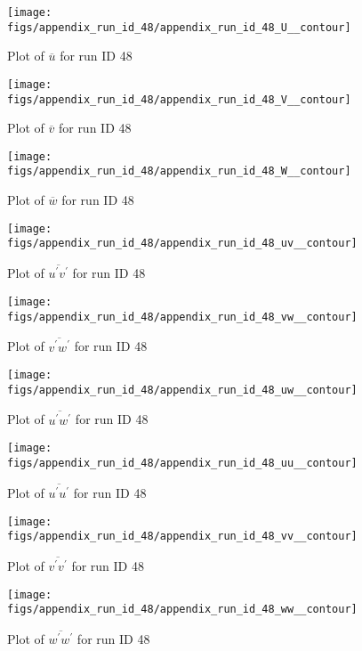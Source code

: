 \begin{figure}[H]
\centering
\texttt{[image: figs/appendix\_run\_id\_48/appendix\_run\_id\_48\_U\_\_contour]}
\caption{Plot of $\overline{u}$ for run ID 48}
\label{fig:appendix_run_id_48_U__contour}
\end{figure}


\begin{figure}[H]
\centering
\texttt{[image: figs/appendix\_run\_id\_48/appendix\_run\_id\_48\_V\_\_contour]}
\caption{Plot of $\overline{v}$ for run ID 48}
\label{fig:appendix_run_id_48_V__contour}
\end{figure}


\begin{figure}[H]
\centering
\texttt{[image: figs/appendix\_run\_id\_48/appendix\_run\_id\_48\_W\_\_contour]}
\caption{Plot of $\overline{w}$ for run ID 48}
\label{fig:appendix_run_id_48_W__contour}
\end{figure}


\begin{figure}[H]
\centering
\texttt{[image: figs/appendix\_run\_id\_48/appendix\_run\_id\_48\_uv\_\_contour]}
\caption{Plot of $\overline{u^\prime v^\prime}$ for run ID 48}
\label{fig:appendix_run_id_48_uv__contour}
\end{figure}


\begin{figure}[H]
\centering
\texttt{[image: figs/appendix\_run\_id\_48/appendix\_run\_id\_48\_vw\_\_contour]}
\caption{Plot of $\overline{v^\prime w^\prime}$ for run ID 48}
\label{fig:appendix_run_id_48_vw__contour}
\end{figure}


\begin{figure}[H]
\centering
\texttt{[image: figs/appendix\_run\_id\_48/appendix\_run\_id\_48\_uw\_\_contour]}
\caption{Plot of $\overline{u^\prime w^\prime}$ for run ID 48}
\label{fig:appendix_run_id_48_uw__contour}
\end{figure}


\begin{figure}[H]
\centering
\texttt{[image: figs/appendix\_run\_id\_48/appendix\_run\_id\_48\_uu\_\_contour]}
\caption{Plot of $\overline{u^\prime u^\prime}$ for run ID 48}
\label{fig:appendix_run_id_48_uu__contour}
\end{figure}


\begin{figure}[H]
\centering
\texttt{[image: figs/appendix\_run\_id\_48/appendix\_run\_id\_48\_vv\_\_contour]}
\caption{Plot of $\overline{v^\prime v^\prime}$ for run ID 48}
\label{fig:appendix_run_id_48_vv__contour}
\end{figure}


\begin{figure}[H]
\centering
\texttt{[image: figs/appendix\_run\_id\_48/appendix\_run\_id\_48\_ww\_\_contour]}
\caption{Plot of $\overline{w^\prime w^\prime}$ for run ID 48}
\label{fig:appendix_run_id_48_ww__contour}
\end{figure}


